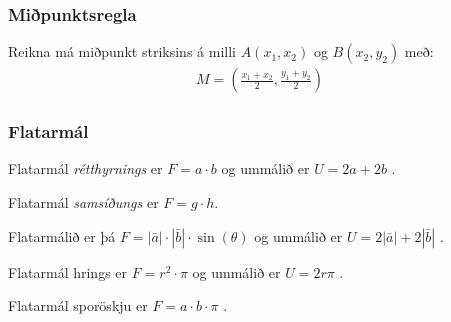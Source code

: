 \documentclass[a4paper,10pt,icelandic]{sphinxmanual}
\begin{document}
\subsubsection{Miðpunktsregla}
\label{\detokenize{Kafli12:mipunktsregla}}
Reikna má miðpunkt striksins á milli \(A(x_1, x_2)\) og \(B(x_2,y_2)\) með:
\begin{equation*}
\begin{split}M = \left( \frac{x_1+x_2}{2} , \frac{y_1+y_2}{2} \right)\end{split}
\end{equation*}

\subsubsection{Flatarmál}
\label{\detokenize{Kafli12:flatarmal}}
Flatarmál \textit{rétthyrnings} er \(F=a\cdot b\) og ummálið er \(U=2a+2b\) .

\begin{figure}[htbp]
\centering

\noindent{}
\end{figure}

Flatarmál \textit{samsíðungs} er \(F=g\cdot h\).

\begin{figure}[htbp]
\centering

\noindent{}
\end{figure}

Flatarmálið er þá \(F=|\bar{a}| \cdot |\bar{b}| \cdot \sin(\theta)\) og ummálið er \(U=2|\bar{a}|+2|\bar{b}|\) .

\begin{figure}[htbp]
\centering

\noindent{}
\end{figure}

Flatarmál hrings er \(F=r^2\cdot\pi\) og ummálið er \(U=2r\pi\) .

\begin{figure}[htbp]
\centering

\noindent{}
\end{figure}

Flatarmál sporöskju er \(F=a\cdot b\cdot\pi\) .

\begin{figure}[htbp]
\centering

\noindent{}
\end{figure}
\end{document}
